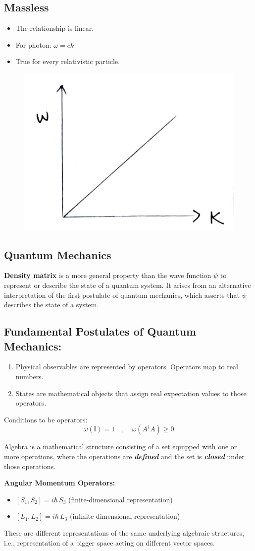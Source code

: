 \documentclass[14pt]{article} %
\begin{document}
\subsection*{Massless}
\begin{itemize}
    \item The relationship is linear.
    \item For photon: $\omega = ck$
    \item True for every relativistic particle.
\end{itemize}
\begin{figure}[H]
\centering
\includegraphics[width=0.45\linewidth]{L(-2)_2.jpg}
\caption*{}
\end{figure}
\vspace{-1cm}
\subsection{Quantum Mechanics}
\textbf{Density matrix} is a more general property than the wave function $\psi$ to represent or describe the state of a quantum system. It arises from an alternative interpretation of the first postulate of quantum mechanics, which asserts that $\psi$ describes the state of a system.
\subsection*{Fundamental Postulates of Quantum Mechanics:}
\begin{enumerate}
    \item Physical observables are represented by operators. Operators map to real numbers.
    \item States are mathematical objects that assign real expectation values to those operators.
\end{enumerate}
Conditions to be operators:
\[
\omega(\mathbb{I}) = 1 \quad , \quad \omega(A^\dagger A) \geq 0
\]
\begin{tcolorbox}[ title=\textbf{Question: What is algebra?}]
Algebra is a mathematical structure consisting of a set equipped with one or more operations, where the operations are \textbf{\textit{defined}} and the set is \textbf{\textit{closed}} under those operations.
\end{tcolorbox}
\textbf{Angular Momentum Operators:}
\begin{itemize}
    \item $[S_1, S_2] = i\hbar\, S_3$ \hfill (finite-dimensional representation)
    \item $[L_1, L_2] = i\hbar\, L_3$ \hfill (infinite-dimensional representation)
\end{itemize}
These are different representations of the same underlying algebraic structures, i.e., representation of a bigger space acting on different vector spaces.
\end{document}
